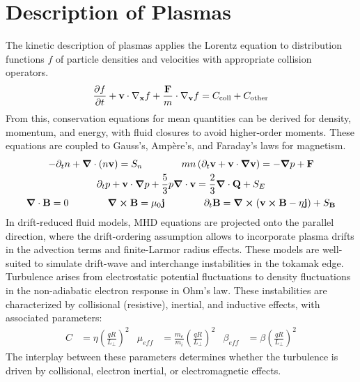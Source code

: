\chapter{Description of Plasmas}
\label{chap:PlasmaSimulations}

\vfill
\begin{chaptersummarybox}
	The kinetic description of plasmas applies the Lorentz equation to distribution functions $f$ of particle densities and velocities with appropriate collision operators.
	\begin{equation*}
		\pdv{f}{t} + \mathbf{v} \cdot \nabla_{\mathbf{x}} f + \frac{\mathbf{F}}{m} \cdot \nabla_{\mathbf{v}} f = C_{\text{coll}} + C_{\text{other}}
	\end{equation*}
	From this, conservation equations for mean quantities can be derived for density, momentum, and energy, with fluid closures to avoid higher-order moments. These equations are coupled to Gauss's, Ampère's, and Faraday's laws for magnetism.
	\begin{gather*}-
		\partial_t n + \grad\cdot\left(n\mathbf{v}\right) = S_n \qquad\qquad
		mn\left(\partial_t \textbf{v} + \textbf{v}\cdot\grad\textbf{v} \right) = -\grad p + \textbf{F} \\
		\partial_t p+\textbf{v}\cdot\grad p + \frac{5}{3}p\grad\cdot\textbf{v} = \frac{2}{3}\grad\cdot\textbf{Q}+S_E  \\
		\grad\cdot\textbf{B} = 0  \qquad\qquad \grad\cross\textbf{B} = \mu_0 \textbf{j}  \qquad\qquad \partial_t \textbf{B} = \grad\cross\left(\textbf{v}\cross\textbf{B} - \eta\textbf{j}\right) + S_\textbf{B}
	\end{gather*}
	In drift-reduced fluid models, MHD equations are projected onto the parallel direction, where the drift-ordering assumption allows to incorporate plasma drifts  in the advection terms and finite-Larmor radius effects. These models are well-suited to simulate drift-wave and interchange instabilities in the tokamak edge. Turbulence arises from electrostatic potential fluctuations  to density fluctuations in the non-adiabatic electron response in Ohm's law. These instabilities are characterized by collisional (resistive), inertial, and inductive effects, with associated parameters:
	\begin{align*}
		C &= \eta\left(\frac{qR}{L_\perp}\right)^2	&
		\mu_{eff} &= \frac{m_e}{m_i}\left(\frac{qR}{L_\perp}\right)^2 &
		\beta_{eff} &= \beta\left(\frac{qR}{L_\perp}\right)^2
	\end{align*}
	The interplay between these parameters determines whether the turbulence is driven by collisional, electron inertial, or electromagnetic effects.
\end{chaptersummarybox}
\vfill
\newpage



